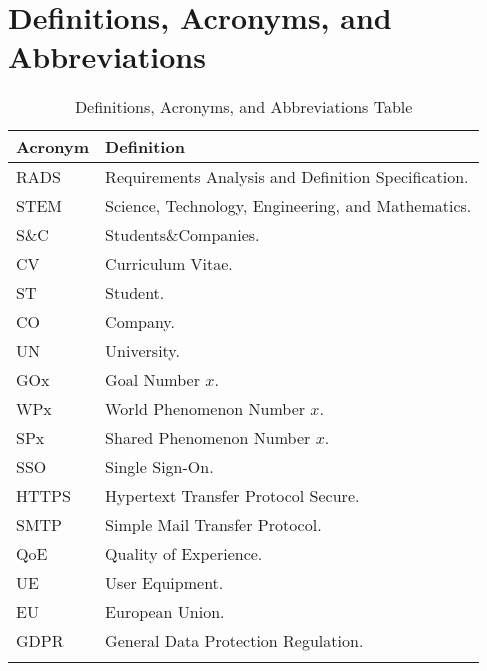\section{Definitions, Acronyms, and Abbreviations}
\label{sec:definitions-acronyms-abbreviations}%

\begin{longtable}{|l|p{}|}
    \hline
    \textbf{Acronym} & \textbf{Definition}                                 \\
    \hline \hline
    RADS             & Requirements Analysis and Definition Specification. \\
    \hline
    STEM             & Science, Technology, Engineering, and Mathematics.  \\
    \hline
    S\&C             & Students\&Companies.                                \\
    \hline
    CV               & Curriculum Vitae.                                   \\
    \hline
    ST               & Student.                                            \\
    \hline
    CO               & Company.                                            \\
    \hline
    UN               & University.                                         \\
    \hline
    GOx              & Goal Number $x$.                                    \\
    \hline
    WPx              & World Phenomenon Number $x$.                        \\
    \hline
    SPx              & Shared Phenomenon Number $x$.                       \\
    \hline
    SSO              & Single Sign-On.                                     \\
    \hline
    HTTPS            & Hypertext Transfer Protocol Secure.                 \\
    \hline
    SMTP             & Simple Mail Transfer Protocol.                      \\
    \hline
    QoE              & Quality of Experience.                              \\
    \hline
    UE               & User Equipment.                                     \\
    \hline
    EU               & European Union.                                     \\
    \hline
    GDPR             & General Data Protection Regulation.                 \\
    \hline
    \caption{Definitions, Acronyms, and Abbreviations Table}
    \label{tab:definitions-acronyms-abbreviations}
\end{longtable}

